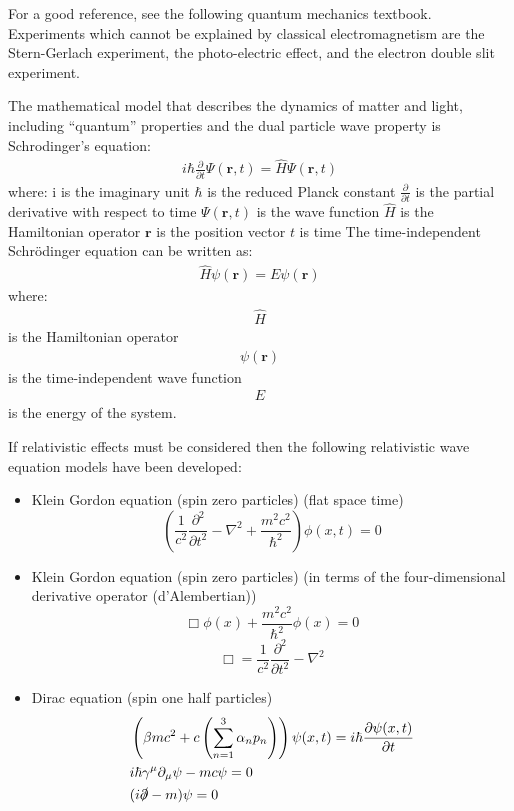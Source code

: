 \documentclass[]{article}
\begin{document}
For a good reference, see the following quantum mechanics 
textbook\cite{sakurai2020modern}.  Experiments which cannot be
explained by classical electromagnetism are the
Stern-Gerlach experiment\cite{gerlach1989experimentelle}, 
the photo-electric effect\cite{wheaton1978philipp}, and
the electron double slit experiment\cite{bach2013controlled}.
\par\noindent
The mathematical model that describes the dynamics of matter and light, including ``quantum'' properties and the dual particle wave property is Schrodinger's equation:
\begin{eqnarray*}
i\hbar \frac{\partial}{\partial t} \Psi(\mathbf{r}, t) = \hat{H} \Psi(\mathbf{r}, t)
\end{eqnarray*}
where:
i is the imaginary unit
$\hbar$ is the reduced Planck constant
$\frac{\partial}{\partial t}$ is the partial derivative with respect to time
$\Psi(\mathbf{r}, t)$ is the wave function
$\hat{H}$ is the Hamiltonian operator
$\mathbf{r}$ is the position vector
$t$ is time
The time-independent Schrödinger equation can be written as:
\begin{eqnarray*}
\hat{H} \psi(\mathbf{r}) = E \psi(\mathbf{r})
\end{eqnarray*}
where:
\begin{eqnarray*}
\hat{H} 
\end{eqnarray*}
is the Hamiltonian operator
\begin{eqnarray*}
\psi(\mathbf{r}) 
\end{eqnarray*}
is the time-independent wave function
\begin{eqnarray*}
E 
\end{eqnarray*}
is the energy of the system.

If relativistic effects must be considered then the following relativistic wave equation models have been developed:
\begin{itemize}
\item Klein Gordon equation (spin zero particles) (flat space time)
\begin{equation}
\left(\frac{1}{c^2}\frac{\partial^2}{\partial t^2} - \nabla^2 + \frac{m^2 c^2}{\hbar^2}\right) \phi(x,t) = 0
\end{equation}
\item Klein Gordon equation (spin zero particles) (in terms of the four-dimensional derivative operator (d'Alembertian))
\begin{equation}
\Box \phi(x) + \frac{m^2 c^2}{\hbar^2} \phi(x) = 0
\end{equation}
\begin{equation}
\Box=\frac{1}{c^{2}}\frac{\partial^{2}}{\partial t^{2}}-\nabla^{2}
\end{equation}
\item Dirac equation (spin one half particles)
\begin{align}
& \left(\beta m c^2 + c \left(\sum_{n=1}^3\alpha_n p_n\right)\right) \psi(x,t) = i\hbar \frac{\partial \psi(x,t)}{\partial t}\\
& i\hbar\gamma^\mu \partial_\mu \psi - mc\psi = 0 \\
& (i\slashed{\partial} - m)\psi = 0
\end{align}
\end{itemize}
\end{document}

